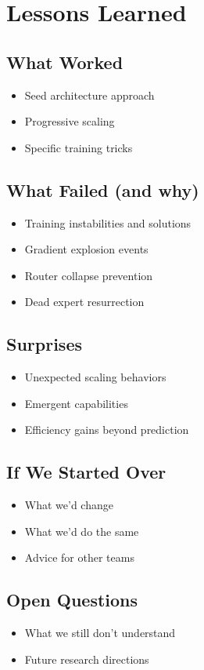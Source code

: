 \section{Lessons Learned}

\subsection{What Worked}
    \begin{itemize}
        \item Seed architecture approach
        \item Progressive scaling
        \item Specific training tricks
    \end{itemize}

\subsection{What Failed (and why)}
    \begin{itemize}
        \item Training instabilities and solutions
        \item Gradient explosion events
        \item Router collapse prevention
        \item Dead expert resurrection
    \end{itemize}

\subsection{Surprises}
    \begin{itemize}
        \item Unexpected scaling behaviors
        \item Emergent capabilities
        \item Efficiency gains beyond prediction
    \end{itemize}
    
\subsection {If We Started Over}
    \begin{itemize}
        \item What we'd change
        \item What we'd do the same
        \item Advice for other teams
    \end{itemize}

\subsection{Open Questions}
    \begin{itemize}
        \item What we still don't understand
        \item Future research directions
    \end{itemize}
